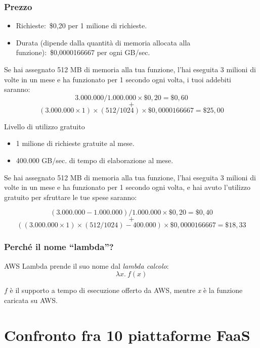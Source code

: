 \subsubsection{Prezzo}

\begin{itemize}
	\item Richieste:\ \$0,20 per 1 milione di richieste.
	\item Durata (dipende dalla quantità di memoria allocata alla funzione):\ \$0,0000166667 per ogni GB/sec.
\end{itemize}

\noindent Se hai assegnato 512 MB di memoria alla tua funzione, l'hai eseguita 3 milioni di volte in un mese e ha funzionato per 1 secondo ogni volta, i tuoi addebiti saranno:\
\[3.000.000/1.000.000 \times \$0,20 = \$0,60  \]
\[+\]
\[ (3.000.000 \times 1) \times (512/1024) \times \$ 0,0000166667 = \$ 25,00 \]

\noindent Livello di utilizzo gratuito

\begin{itemize}
	\item 1 milione di richieste gratuite al mese.
	\item 400.000 GB/sec. di tempo di elaborazione al mese.
\end{itemize}

\noindent Se hai assegnato 512 MB di memoria alla tua funzione, l'hai eseguita 3 milioni di volte in un mese e ha funzionato per 1 secondo ogni volta, e hai avuto l'utilizzo gratuito per sfruttare le tue spese saranno:

\[ (3.000.000-1.000.000)/1.000.000 \times \$ 0,20 = \$ 0,40\]
\[+\]
\[((3.000.000 \times 1) \times (512/1024) - 400.000) \times \$ 0,0000166667 = \$ 18,33\]

\subsubsection{Perché il nome ``lambda''?}

AWS Lambda prende il suo nome dal \textit{lambda calcolo}:\
\[ \lambda x.\ f(x)\]

\noindent $f$ è il supporto a tempo di esecuzione offerto da AWS, mentre \textit{x} è la funzione caricata su AWS.

\section{Confronto fra 10 piattaforme FaaS}

